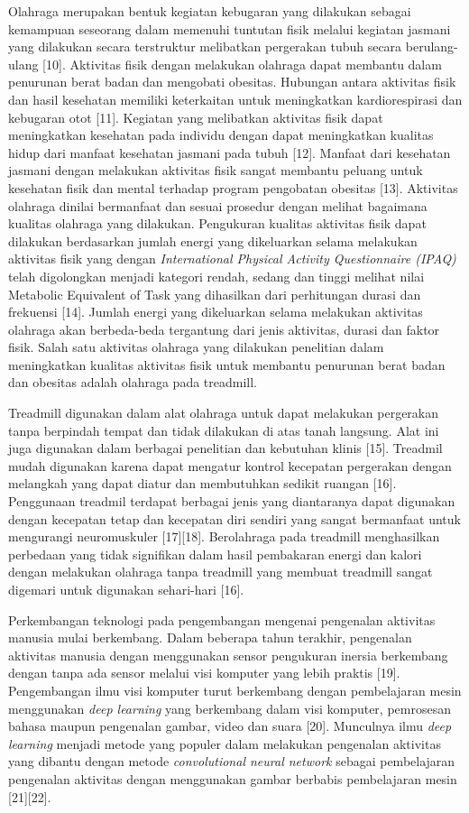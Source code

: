 Olahraga merupakan bentuk kegiatan kebugaran yang dilakukan sebagai kemampuan seseorang dalam memenuhi tuntutan fisik melalui kegiatan jasmani yang dilakukan secara terstruktur melibatkan pergerakan tubuh secara berulang-ulang [10]. Aktivitas fisik dengan melakukan olahraga dapat membantu dalam penurunan berat badan dan mengobati obesitas. Hubungan antara aktivitas fisik dan hasil kesehatan memiliki keterkaitan untuk meningkatkan kardiorespirasi dan kebugaran otot [11]. Kegiatan yang melibatkan aktivitas fisik dapat meningkatkan kesehatan pada individu dengan dapat meningkatkan kualitas hidup dari manfaat kesehatan jasmani pada tubuh [12]. Manfaat dari kesehatan jasmani dengan melakukan aktivitas fisik sangat membantu peluang untuk kesehatan fisik dan mental terhadap program pengobatan obesitas [13]. Aktivitas olahraga dinilai bermanfaat dan sesuai prosedur dengan melihat bagaimana kualitas olahraga yang dilakukan. Pengukuran kualitas aktivitas fisik dapat dilakukan berdasarkan jumlah energi yang dikeluarkan selama melakukan aktivitas fisik yang dengan \emph{International Physical Activity Questionnaire (IPAQ)} telah digolongkan menjadi kategori rendah, sedang dan tinggi melihat nilai Metabolic Equivalent of Task yang dihasilkan dari perhitungan durasi dan frekuensi [14]. Jumlah energi yang dikeluarkan selama melakukan aktivitas olahraga akan berbeda-beda tergantung dari jenis aktivitas, durasi dan faktor fisik. Salah satu aktivitas olahraga yang dilakukan penelitian dalam meningkatkan kualitas aktivitas fisik untuk membantu penurunan berat badan dan obesitas adalah olahraga pada treadmill.

Treadmill digunakan dalam alat olahraga untuk dapat melakukan pergerakan tanpa berpindah tempat dan tidak dilakukan di atas tanah langsung. Alat ini juga digunakan dalam berbagai penelitian dan kebutuhan klinis [15]. Treadmil mudah digunakan karena dapat mengatur kontrol kecepatan pergerakan dengan melangkah yang dapat diatur dan membutuhkan sedikit ruangan [16]. Penggunaan treadmil terdapat berbagai jenis yang diantaranya dapat digunakan dengan kecepatan tetap dan kecepatan diri sendiri yang sangat bermanfaat untuk mengurangi neuromuskuler [17][18]. Berolahraga pada treadmill menghasilkan perbedaan yang tidak signifikan dalam hasil pembakaran energi dan kalori dengan melakukan olahraga tanpa treadmill yang membuat treadmill sangat digemari untuk digunakan sehari-hari [16].

Perkembangan teknologi pada pengembangan mengenai pengenalan aktivitas manusia mulai berkembang. Dalam beberapa tahun terakhir, pengenalan aktivitas manusia dengan menggunakan sensor pengukuran inersia berkembang dengan tanpa ada sensor melalui visi komputer yang lebih praktis [19]. Pengembangan ilmu visi komputer turut berkembang dengan pembelajaran mesin menggunakan \emph{deep learning} yang berkembang dalam visi komputer, pemrosesan bahasa maupun pengenalan gambar, video dan suara [20]. Munculnya ilmu \emph{deep learning} menjadi metode yang populer dalam melakukan pengenalan aktivitas yang dibantu dengan metode \emph{convolutional neural network} sebagai pembelajaran pengenalan aktivitas dengan menggunakan gambar berbabis pembelajaran mesin [21][22].


